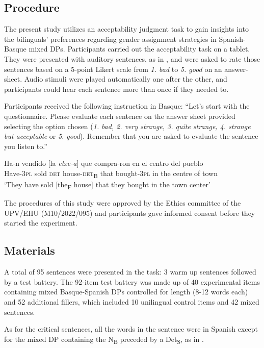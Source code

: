\documentclass[output=paper]{langscibook}
\begin{document}
\subsection{Procedure}\label{sec:ezeiza:3.2}

The present study utilizes an acceptability judgment task to gain insights into the bilinguals’ preferences regarding gender assignment strategies in Spanish-Basque mixed DPs. Participants carried out the acceptability task on a tablet. They were presented with auditory sentences, as in , and were asked to rate those sentences based on a 5-point Likert scale from \textit{1. bad} to \textit{5. good} on an answer-sheet. Audio stimuli were played automatically one after the other, and participants could hear each sentence more than once if they needed to.

Participants received the following instruction in Basque: “Let’s start with the questionnaire. Please evaluate each sentence on the answer sheet provided selecting the option chosen (\textit{1.} \textit{bad, 2. very strange, 3. quite strange, 4. strange but acceptable} or \textit{5. good}). Remember that you are asked to evaluate the sentence you listen to.”

\ea%
    \label{ex:ezeiza:12}
\gll        Ha-n  vendido [la \textit{etxe-a}]       que compra-ron  en el    centro del pueblo\\
        Have-3\textsc{pl}   sold        \textsc{det} house-\textsc{det}\textsubscript{B}   that bought-3\textsc{pl}   in  the centre  of   town\\
     \glt ‘They have sold [the\textsubscript{F} house] that they bought in the town center’
    \z

The procedures of this study were approved by the Ethics committee of the UPV/EHU (M10/2022/095) and participants gave informed consent before they started the experiment.

\subsection{Materials}\label{sec:ezeiza:3.3}

A total of 95 sentences were presented in the task: 3 warm up sentences followed by a test battery. The 92-item test battery was made up of 40 experimental items containing mixed Basque-Spanish DPs controlled for length (8-12 words each) and 52 additional fillers, which included 10 unilingual control items and 42 mixed sentences.

As for the critical sentences, all the words in the sentence were in Spanish except for the mixed DP containing the N\textsubscript{B} preceded by a Det\textsubscript{S}, as in .
\end{document}
